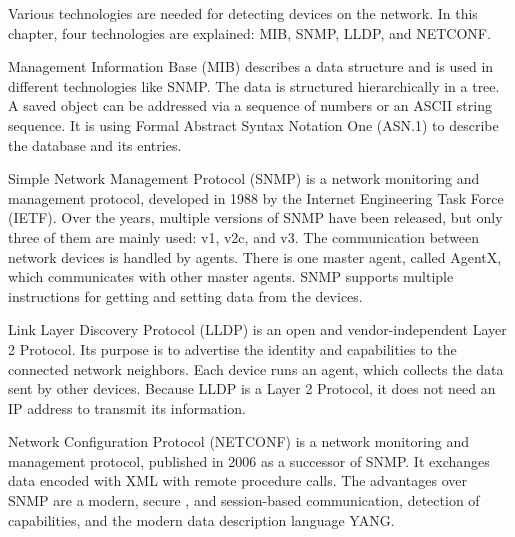 Various technologies are needed for detecting devices on the network. In this chapter, four technologies are explained: MIB, SNMP, LLDP, and NETCONF.

Management Information Base (MIB) describes a data structure and is used in different technologies like SNMP. The data is structured hierarchically in a tree. A saved object can be addressed via a sequence of numbers or an ASCII string sequence. It is using Formal Abstract Syntax Notation One (ASN.1) to describe the database and its entries.

Simple Network Management Protocol (SNMP) is a network monitoring and management protocol, developed in 1988 by the
Internet Engineering Task Force (IETF). Over the years, multiple versions of SNMP have been released, but only three
of them are mainly used: v1, v2c, and v3. The communication between network devices is handled by agents. There is one master agent, called AgentX, which communicates with other master agents. SNMP supports multiple instructions for getting and setting data from the devices.

Link Layer Discovery Protocol (LLDP) is an open and vendor-independent Layer 2 Protocol. Its purpose is
to advertise the identity and capabilities to the connected network neighbors. Each device runs an agent, which collects the data sent by other devices. Because LLDP is a Layer 2 Protocol, it does not need an IP address to transmit its information.

Network Configuration Protocol (NETCONF) is a network monitoring and management protocol, published in 2006 as a successor of SNMP. It exchanges data encoded with XML with remote procedure calls. The advantages over SNMP are a modern, secure , and session-based communication, detection of capabilities, and the modern data description language YANG.








